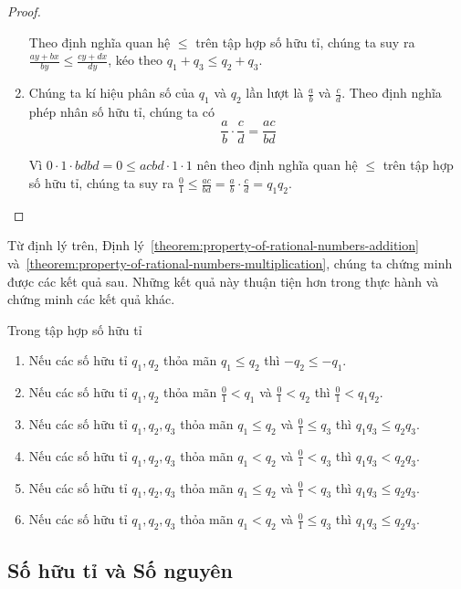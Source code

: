 \begin{proof}
\begin{enumerate}[label={(\roman*)}]
		      Theo định nghĩa quan hệ $\leq$ trên tập hợp số hữu tỉ, chúng ta suy ra $\frac{ay + bx}{by}\leq \frac{cy + dx}{dy}$, kéo theo $q_{1} + q_{3}\leq q_{2} + q_{3}$.
		\item Chúng ta kí hiệu phân số của $q_{1}$ và $q_{2}$ lần lượt là $\frac{a}{b}$ và $\frac{c}{d}$. Theo định nghĩa phép nhân số hữu tỉ, chúng ta có
		      \[
			      \frac{a}{b}\cdot \frac{c}{d} = \frac{ac}{bd}
		      \]

		      Vì $0\cdot 1\cdot bdbd = 0 \leq acbd\cdot 1\cdot 1$ nên theo định nghĩa quan hệ $\leq$ trên tập hợp số hữu tỉ, chúng ta suy ra $\frac{0}{1}\leq \frac{ac}{bd} = \frac{a}{b}\cdot\frac{c}{d} = q_{1}q_{2}$.
	\end{enumerate}
\end{proof}

Từ định lý trên, Định lý~\ref{theorem:property-of-rational-numbers-addition} và~\ref{theorem:property-of-rational-numbers-multiplication}, chúng ta chứng minh được các kết quả sau. Những kết quả này thuận tiện hơn trong thực hành và chứng minh các kết quả khác.
\begin{theorem}\label{theorem:rational-numbers-order-and-operations-sequel}
	Trong tập hợp số hữu tỉ
	\begin{enumerate}[label={(\roman*)}]
		\item Nếu các số hữu tỉ $q_{1}, q_{2}$ thỏa mãn $q_{1}\leq q_{2}$ thì $-q_{2}\leq -q_{1}$.
		\item Nếu các số hữu tỉ $q_{1}, q_{2}$ thỏa mãn $\frac{0}{1} < q_{1}$ và $\frac{0}{1} < q_{2}$ thì $\frac{0}{1} < q_{1}q_{2}$.
		\item Nếu các số hữu tỉ $q_{1}, q_{2}, q_{3}$ thỏa mãn $q_{1}\leq q_{2}$ và $\frac{0}{1}\leq q_{3}$ thì $q_{1}q_{3}\leq q_{2}q_{3}$.
		\item Nếu các số hữu tỉ $q_{1}, q_{2}, q_{3}$ thỏa mãn $q_{1} < q_{2}$ và $\frac{0}{1} < q_{3}$ thì $q_{1}q_{3} < q_{2}q_{3}$.
		\item Nếu các số hữu tỉ $q_{1}, q_{2}, q_{3}$ thỏa mãn $q_{1}\leq q_{2}$ và $\frac{0}{1} < q_{3}$ thì $q_{1}q_{3}\leq q_{2}q_{3}$.
		\item Nếu các số hữu tỉ $q_{1}, q_{2}, q_{3}$ thỏa mãn $q_{1} < q_{2}$ và $\frac{0}{1}\leq q_{3}$ thì $q_{1}q_{3}\leq q_{2}q_{3}$.
	\end{enumerate}
\end{theorem}

\subsection{Số hữu tỉ và Số nguyên}

